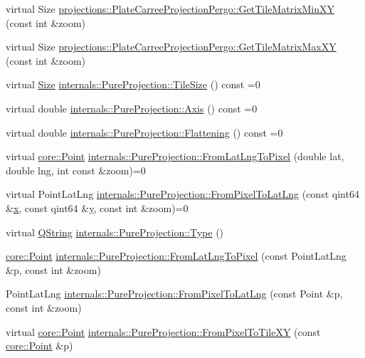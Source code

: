 \begin{DoxyCompactItemize}
\item 
virtual \-Size \hyperlink{group___o_p_map_widget_ga95a4e9e98cce1bb7cc3d4afb9e30f1b7}{projections\-::\-Plate\-Carree\-Projection\-Pergo\-::\-Get\-Tile\-Matrix\-Min\-X\-Y} (const int \&zoom)
\item 
virtual \-Size \hyperlink{group___o_p_map_widget_gabf54183dc66f5385ffa794ce7120629c}{projections\-::\-Plate\-Carree\-Projection\-Pergo\-::\-Get\-Tile\-Matrix\-Max\-X\-Y} (const int \&zoom)
\item 
virtual \hyperlink{structcore_1_1_size}{\-Size} \hyperlink{group___o_p_map_widget_ga745313ff69d0f869f456ccbc312cc2bf}{internals\-::\-Pure\-Projection\-::\-Tile\-Size} () const =0
\item 
virtual double \hyperlink{group___o_p_map_widget_ga72d36ba021583a6dec5f549c6137494a}{internals\-::\-Pure\-Projection\-::\-Axis} () const =0
\item 
virtual double \hyperlink{group___o_p_map_widget_ga253e85d9958729b994bf7b9e075297de}{internals\-::\-Pure\-Projection\-::\-Flattening} () const =0
\item 
virtual \hyperlink{structcore_1_1_point}{core\-::\-Point} \hyperlink{group___o_p_map_widget_gacadfc01954e3e37c801106981b297b45}{internals\-::\-Pure\-Projection\-::\-From\-Lat\-Lng\-To\-Pixel} (double lat, double lng, int const \&zoom)=0
\item 
virtual \-Point\-Lat\-Lng \hyperlink{group___o_p_map_widget_ga235a8ad2ed5da22f78e0c5d447f8d34c}{internals\-::\-Pure\-Projection\-::\-From\-Pixel\-To\-Lat\-Lng} (const qint64 \&\hyperlink{_o_p_plots_8m_a9336ebf25087d91c818ee6e9ec29f8c1}{x}, const qint64 \&\hyperlink{_o_p_plots_8m_a2fb1c5cf58867b5bbc9a1b145a86f3a0}{y}, const int \&zoom)=0
\item 
virtual \hyperlink{group___u_a_v_objects_plugin_gab9d252f49c333c94a72f97ce3105a32d}{\-Q\-String} \hyperlink{group___o_p_map_widget_gae371ba9189e5318e016af0df9cf0123f}{internals\-::\-Pure\-Projection\-::\-Type} ()
\item 
\hyperlink{structcore_1_1_point}{core\-::\-Point} \hyperlink{group___o_p_map_widget_ga18aa4617ab63019451badac8567c85d8}{internals\-::\-Pure\-Projection\-::\-From\-Lat\-Lng\-To\-Pixel} (const \-Point\-Lat\-Lng \&p, const int \&zoom)
\item 
\-Point\-Lat\-Lng \hyperlink{group___o_p_map_widget_ga44df6b58603a8cdba19f7bf899cc57bc}{internals\-::\-Pure\-Projection\-::\-From\-Pixel\-To\-Lat\-Lng} (const \-Point \&p, const int \&zoom)
\item 
virtual \hyperlink{structcore_1_1_point}{core\-::\-Point} \hyperlink{group___o_p_map_widget_ga44846fe14a2b915a79c730b0b6513579}{internals\-::\-Pure\-Projection\-::\-From\-Pixel\-To\-Tile\-X\-Y} (const \hyperlink{structcore_1_1_point}{core\-::\-Point} \&p)

\end{DoxyCompactItemize}
